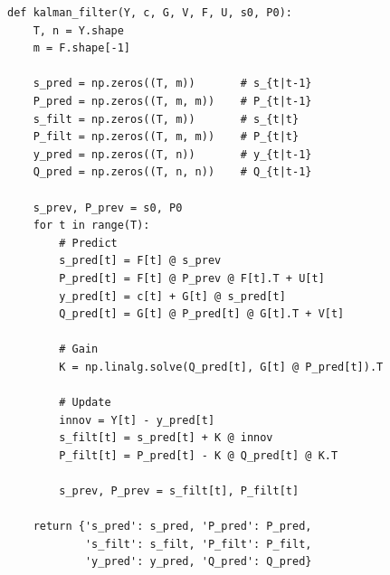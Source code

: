 
\begin{frame}[fragile]
\tiny
\begin{verbatim}
def kalman_filter(Y, c, G, V, F, U, s0, P0):
    T, n = Y.shape
    m = F.shape[-1]

    s_pred = np.zeros((T, m))       # s_{t|t-1}
    P_pred = np.zeros((T, m, m))    # P_{t|t-1}
    s_filt = np.zeros((T, m))       # s_{t|t}
    P_filt = np.zeros((T, m, m))    # P_{t|t}
    y_pred = np.zeros((T, n))       # y_{t|t-1}
    Q_pred = np.zeros((T, n, n))    # Q_{t|t-1}

    s_prev, P_prev = s0, P0
    for t in range(T):
        # Predict
        s_pred[t] = F[t] @ s_prev
        P_pred[t] = F[t] @ P_prev @ F[t].T + U[t]
        y_pred[t] = c[t] + G[t] @ s_pred[t]
        Q_pred[t] = G[t] @ P_pred[t] @ G[t].T + V[t]

        # Gain
        K = np.linalg.solve(Q_pred[t], G[t] @ P_pred[t]).T

        # Update
        innov = Y[t] - y_pred[t]
        s_filt[t] = s_pred[t] + K @ innov
        P_filt[t] = P_pred[t] - K @ Q_pred[t] @ K.T

        s_prev, P_prev = s_filt[t], P_filt[t]

    return {'s_pred': s_pred, 'P_pred': P_pred,
            's_filt': s_filt, 'P_filt': P_filt,
            'y_pred': y_pred, 'Q_pred': Q_pred}
\end{verbatim}
\end{frame}

